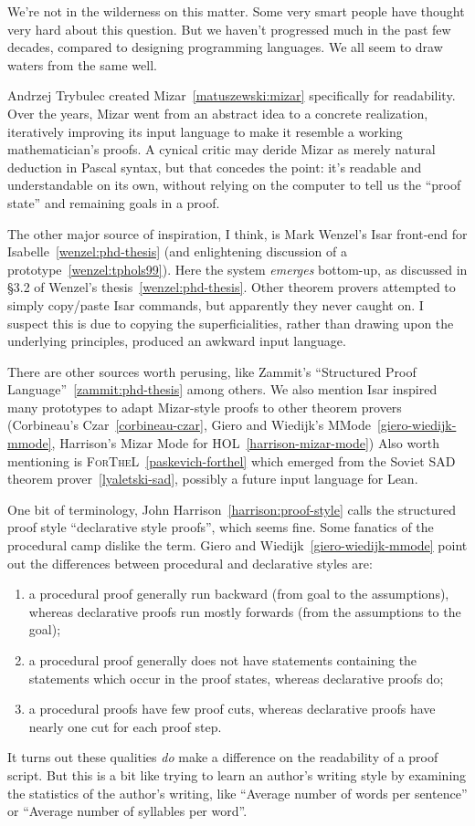 We're not in the wilderness on this matter. Some very smart people have
thought very hard about this question. But we haven't progressed much in
the past few decades, compared to designing programming languages. We
all seem to draw waters from the same well.

Andrzej Trybulec created Mizar~\ref{matuszewski:mizar} specifically for
readability. Over the years, Mizar went from an abstract idea to a
concrete realization, iteratively improving its input language to make
it resemble a working mathematician's proofs. A cynical critic may
deride Mizar as merely natural deduction in Pascal syntax, but that
concedes the point: it's readable and understandable on its own, without
relying on the computer to tell us the ``proof state'' and remaining
goals in a proof.

The other major source of inspiration, I think, is Mark Wenzel's Isar
front-end for Isabelle~\ref{wenzel:phd-thesis} (and enlightening
discussion of a prototype~\ref{wenzel:tphols99}). Here the system
\emph{emerges} bottom-up, as discussed in \S3.2 of Wenzel's
thesis~\ref{wenzel:phd-thesis}. Other theorem provers attempted to
simply copy/paste Isar commands, but apparently they never caught on. I
suspect this is due to copying the superficialities, rather than drawing
upon the underlying principles, produced an awkward input language.

There are other sources worth perusing, like Zammit's ``Structured Proof
Language''~\ref{zammit:phd-thesis} among others. We also mention Isar
inspired many prototypes to adapt Mizar-style proofs to other theorem
provers (Corbineau's Czar~\ref{corbineau-czar}, Giero and Wiedijk's MMode~\ref{giero-wiedijk-mmode},
Harrison's Mizar Mode for HOL~\ref{harrison-mizar-mode})
Also worth mentioning is \textsc{ForTheL}~\ref{paskevich-forthel} which
emerged from the Soviet SAD theorem prover~\ref{lyaletski-sad}, possibly
a future input language for Lean.

One bit of terminology, John Harrison~\ref{harrison:proof-style} calls
the structured proof style ``declarative style proofs'', which seems
fine. Some fanatics of the procedural camp dislike the term. Giero and
Wiedijk~\ref{giero-wiedijk-mmode} point out the
differences between procedural and declarative styles are:
\begin{enumerate}
\item a procedural proof generally run backward (from goal to the
  assumptions), whereas declarative proofs run mostly forwards (from the
  assumptions to the goal);
\item a procedural proof generally does not have statements containing
  the statements which occur in the proof states, whereas declarative
  proofs do;
\item a procedural proofs have few proof cuts, whereas declarative
  proofs have nearly one cut for each proof step.
\end{enumerate}
It turns out these qualities \emph{do} make a difference on the
readability of a proof script. But this is a bit like trying to learn an
author's writing style by examining the statistics of the author's
writing, like ``Average number of words per sentence'' or ``Average
number of syllables per word''.

